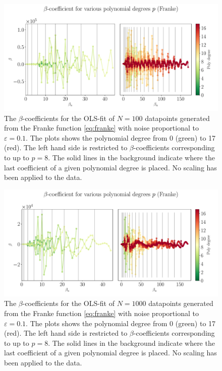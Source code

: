 \documentclass[%
reprint,
amsmath,amssymb,
aps,
pra,
]{revtex4-2}
\begin{document}
\begin{figure}[H]
	\hspace{-7.5mm}
	\includegraphics[width=1.15\linewidth]{Python/Figures/OLS/OLS_betano_scaling_100.pdf}
	\caption{The \(\beta\)-coefficients for the OLS-fit of \(N=100\) datapoints generated from the Franke function \eqref{eq:franke} with noise proportional to \(\varepsilon=0.1\). The plots shows the polynomial degree from 0 (green) to 17 (red). The left hand side is restricted to \(\beta\)-coefficients corresponding to up to \(p=8\). The solid lines in the background indicate where the last coefficient of a given polynomial degree is placed. No scaling has been applied to the data.}
\label{fig:OLS_beta_degree_100}
\end{figure}
\begin{figure}[H]
	\hspace{-7.5mm}
	\includegraphics[width=1.15\linewidth]{Python/Figures/OLS/OLS_betano_scaling_1000.pdf}
	\caption{The \(\beta\)-coefficients for the OLS-fit of \(N=1000\) datapoints generated from the Franke function \eqref{eq:franke} with noise proportional to \(\varepsilon=0.1\). The plots shows the polynomial degree from 0 (green) to 17 (red). The left hand side is restricted to \(\beta\)-coefficients corresponding to up to \(p=8\). The solid lines in the background indicate where the last coefficient of a given polynomial degree is placed. No scaling has been applied to the data.}
\label{fig:OLS_beta_degree_1000}
\end{figure}
\end{document}
